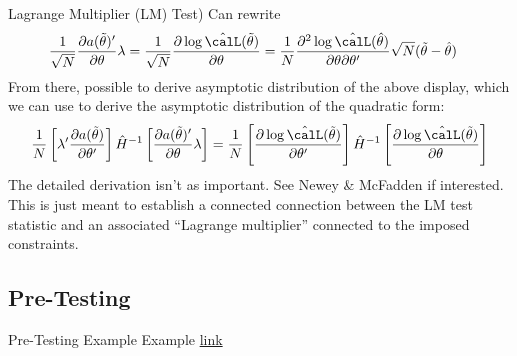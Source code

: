 \documentclass[aspectratio=169, handout]{beamer}
\newcommand*{\Chi}{\mbox{\large$\chi$}} %
\newcommand{\dto}{\xrightarrow{d}}
\begin{document}
\begin{frame}[shrink]{Lagrange Multiplier (LM) Test)}
Can rewrite
\begin{align*}
  \frac{1}{\sqrt{N}}
  \frac{\partial a(\tilde{\theta})'}{\partial \theta}
  \lambda
  =
  \frac{1}{\sqrt{N}}
  \frac{%
    \partial \log \hat{\calL}(\tilde{\theta})
  }{%
    \partial\theta
  }
  &=
  \frac{1}{N}
  \frac{%
    \partial^2 \log \hat{\calL}(\hat{\theta})
  }{%
    \partial \theta
    \partial\theta'
  }
  \sqrt{N}(\tilde{\theta}-\hat{\theta})
\end{align*}
From there, possible to derive asymptotic distribution of the above
display, which we can use to derive the asymptotic distribution of the
quadratic form:
\begin{align*}
  \frac{1}{N}
  \left[
  \lambda'
  \frac{\partial a(\tilde{\theta})}{\partial \theta'}
  \right]
  \hat{H}^{-1}
  \left[
  \frac{\partial a(\tilde{\theta})'}{\partial \theta}
  \lambda
  \right]
  =
  \frac{1}{N}
  \left[
  \frac{%
    \partial \log \hat{\calL}(\tilde{\theta})
  }{%
    \partial\theta'
  }
  \right]
  \hat{H}^{-1}
  \left[
  \frac{%
    \partial \log \hat{\calL}(\tilde{\theta})
  }{%
    \partial\theta
  }
  \right]
\end{align*}
The detailed derivation isn't as important. See Newey \& McFadden if
interested.
This is just meant to establish a connected connection between the LM
test statistic and an associated ``Lagrange multiplier'' connected to
the imposed constraints.
\end{frame}


\subsection{Pre-Testing}


{\footnotesize
\begin{frame}{Pre-Testing Example}
Example
\href{https://davegiles.blogspot.com/2016/05/a-quick-illustration-of-pre-testing-bias.html}{link}
\end{frame}
}
\end{document}
